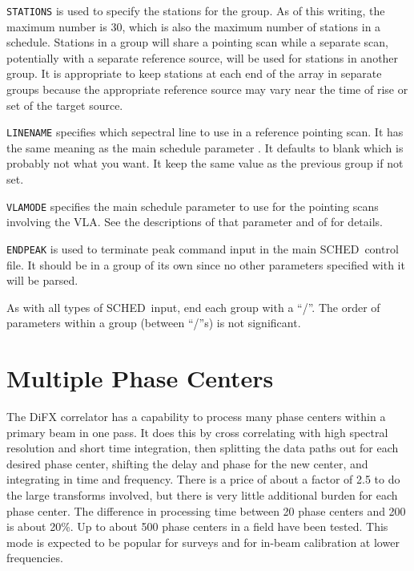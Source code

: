 \documentclass{report}
\newcommand{\schedb}{{\sc SCHED~}}
\begin{document}
\begin{list}{}{\parsep 0em  \itemsep 0em }
\item {\tt STATIONS} is used to specify the stations for the group.
As of this writing, the maximum number is 30, which is also the maximum
number of stations in a schedule.  Stations in a group will share a
pointing scan while a separate scan, potentially with a separate
reference source, will be used for stations in another group.  It
is appropriate to keep stations at each end of the array in separate
groups because the appropriate reference source may vary near
the time of rise or set of the target source.

\item {\tt LINENAME} specifies which sepectral line to use in a reference
pointing scan.  It has the same meaning as the main schedule parameter
.  It defaults to blank which is
probably not what you want.  It keep the same value as the previous
group if not set.

\item {\tt VLAMODE} specifies the main schedule parameter
 to use for the pointing scans
involving the VLA.  See the descriptions of that parameter and of
 for details.

\item {\tt ENDPEAK} is used to terminate peak command input in the
main \schedb control file.  It should be in a group of its own since
no other parameters specified with it will be parsed.

\end{list}

As with all types of \schedb input, end each group with a ``/''.  The
order of parameters within a group (between ``/''s) is not significant.

\section{\label{SEC:MULTIPLE_CENTERS}Multiple Phase Centers}

The DiFX correlator has a capability to process many phase centers
within a primary beam in one pass.  It does this by cross correlating
with high spectral resolution and short time integration, then
splitting the data paths out for each desired phase center, shifting
the delay and phase for the new center, and integrating in time and
frequency.  There is a price of about a factor of 2.5 to do the
large transforms involved, but there is very little additional burden
for each phase center.  The difference in processing time between 20
phase centers and 200 is about 20\%.  Up to about 500 phase centers in
a field have been tested.  This mode is expected to be popular for
surveys and for in-beam calibration at lower frequencies.
\end{document}
